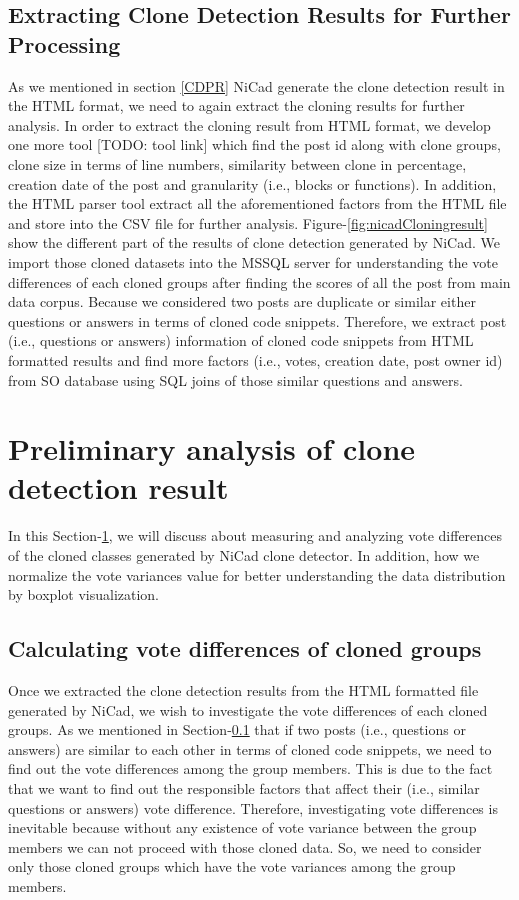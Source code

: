 \documentclass[conference]{IEEEtran}
\begin{document}
	\subsection{Extracting Clone Detection Results for Further Processing }\label{ECDR}
	As we mentioned in section \ref{CDPR} NiCad generate the clone detection result in the HTML format, we need to again extract the cloning results for further analysis. In order to extract the cloning result from HTML format, we develop one more tool [TODO: tool link] which find the post id along with clone groups, clone size in terms of line numbers, similarity between clone in percentage, creation date of the post and granularity (i.e., blocks or functions). In addition, the HTML parser tool extract all the aforementioned factors from the HTML file and store into the CSV file for further analysis. Figure-\ref{fig:nicadCloningresult} show the different part of the results of clone detection generated by NiCad. We import those cloned datasets into the MSSQL server for understanding the vote differences of each cloned groups after finding the scores of all the post from main data corpus. Because we considered two posts are duplicate or similar either questions or answers in terms of cloned code snippets. Therefore, we extract post (i.e., questions or answers) information of cloned code snippets from HTML formatted results and find more factors (i.e., votes, creation date, post owner id) from SO database using SQL joins of those similar questions and answers. 
	
	\section{Preliminary analysis of clone detection result } \label{PAOC}
	In this Section-\ref{PAOC}, we will discuss about measuring and analyzing vote differences of the cloned classes generated by NiCad clone detector. In addition, how we normalize the vote variances value for better understanding the data distribution by boxplot visualization.     
	
	\subsection{Calculating vote differences of cloned groups}
	Once we extracted the clone detection results from the HTML formatted file generated by NiCad, we wish to investigate the vote differences of each cloned groups. As we mentioned in Section-\ref{ECDR} that if two posts (i.e., questions or answers) are similar to each other in terms of cloned code snippets, we need to find out the vote differences among the group members. This is due to the fact that we want to find out the responsible factors that affect their (i.e., similar questions or answers) vote difference. Therefore, investigating vote differences is inevitable because without any existence of vote variance between the group members we can not proceed with those cloned data.  So, we need to consider only those cloned groups which have the vote variances among the group members.  
	
\end{document}
